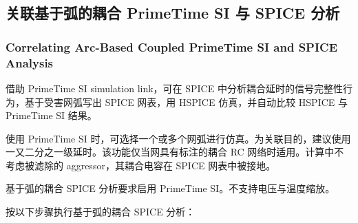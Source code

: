 \subsection{关联基于弧的耦合 PrimeTime SI 与 SPICE 分析}
\subsubsection*{Correlating Arc-Based Coupled PrimeTime SI and SPICE Analysis}

借助 PrimeTime SI simulation link，可在 SPICE 中分析耦合延时的信号完整性行为，基于受害网弧写出 SPICE 网表，用 HSPICE 仿真，并自动比较 HSPICE 与 PrimeTime SI 结果。

使用 PrimeTime SI 时，可选择一个或多个网弧进行仿真。为关联目的，建议使用一又二分之一级延时。该功能仅当网具有标注的耦合 RC 网络时适用。计算中不考虑被滤除的 aggressor，其耦合电容在 SPICE 网表中被接地。

基于弧的耦合 SPICE 分析要求启用 PrimeTime SI。不支持电压与温度缩放。

按以下步骤执行基于弧的耦合 SPICE 分析：

